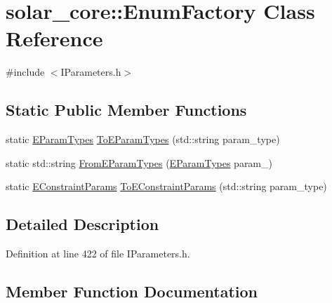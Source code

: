 \hypertarget{classsolar__core_1_1_enum_factory}{}\section{solar\+\_\+core\+:\+:Enum\+Factory Class Reference}
\label{classsolar__core_1_1_enum_factory}


{\ttfamily \#include $<$I\+Parameters.\+h$>$}

\subsection*{Static Public Member Functions}
\begin{DoxyCompactItemize}
\item 
static \hyperlink{namespacesolar__core_aa1147341e5ef7a40d68d1bd68e149362}{E\+Param\+Types} \hyperlink{classsolar__core_1_1_enum_factory_a573986ee0b4951d5ecc6a8c100f892e8}{To\+E\+Param\+Types} (std\+::string param\+\_\+type)
\item 
static std\+::string \hyperlink{classsolar__core_1_1_enum_factory_a7f31a62dd221ed41128618d9eb74b4ee}{From\+E\+Param\+Types} (\hyperlink{namespacesolar__core_aa1147341e5ef7a40d68d1bd68e149362}{E\+Param\+Types} param\+\_\+)
\item 
static \hyperlink{namespacesolar__core_ac827fdef4412a3c0d5e44d3f31908e49}{E\+Constraint\+Params} \hyperlink{classsolar__core_1_1_enum_factory_a1763c822c6b7da0b574ef80045cd59a8}{To\+E\+Constraint\+Params} (std\+::string param\+\_\+type)
\end{DoxyCompactItemize}


\subsection{Detailed Description}


Definition at line 422 of file I\+Parameters.\+h.



\subsection{Member Function Documentation}
\hypertarget{classsolar__core_1_1_enum_factory_a7f31a62dd221ed41128618d9eb74b4ee}{}
